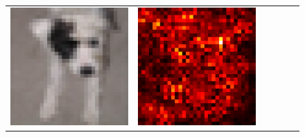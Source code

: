 \documentclass[preprint,12pt]{elsarticle}
\begin{document}
\begin{figure}[p]
\begin{tabular}{cccccc}
  \includegraphics[scale=\scale]{../visualizations/examples/cifar10/resnet18/images/5.png} &
  \includegraphics[scale=\scale]{../visualizations/examples/cifar10/resnet18/saliency_map/5.png} & 

\end{tabular}
\end{figure}
\end{document}
